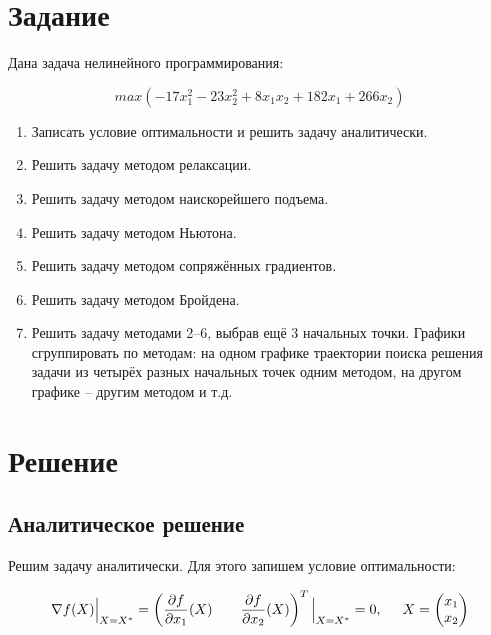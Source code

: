 





\section{Задание}

Дана задача нелинейного программирования:

\begin{displaymath}
	max \left( -17 x^2_1 - 23 x^2_2 + 8 x_1 x_2 + 182 x_1 + 266 x_2 \right)
\end{displaymath}

\begin{enumerate}

	\item Записать условие оптимальности и решить задачу аналитически.
	
	\item Решить задачу методом релаксации.
	
	\item Решить задачу методом наискорейшего подъема.
	
	\item Решить задачу методом Ньютона.	
	
	\item Решить задачу методом сопряжённых градиентов.

	\item Решить задачу методом Бройдена.
	
	\item Решить задачу методами 2--6, выбрав ещё 3 начальных точки. Графики сгруппировать по методам: на одном графике траектории поиска решения задачи из четырёх разных начальных точек одним методом, на другом графике – другим методом и т.д. 

\end{enumerate}

\section{Решение}

\subsection{Аналитическое решение}

Решим задачу аналитически. Для этого запишем условие оптимальности:

\begin{equation}
\label{eq:opt-cond}
	\nabla f(X) \Big|_{X = X^*} = \left(  \frac{\partial f}{\partial x_1}(X) \hspace{7mm} \frac{\partial f}{\partial x_2}(X) \right)^T \Big|_{X = X^*} = 0, \hspace{5mm} X = 
	\begin{pmatrix}
		x_1
		\\
		x_2
	\end{pmatrix}
\end{equation}

